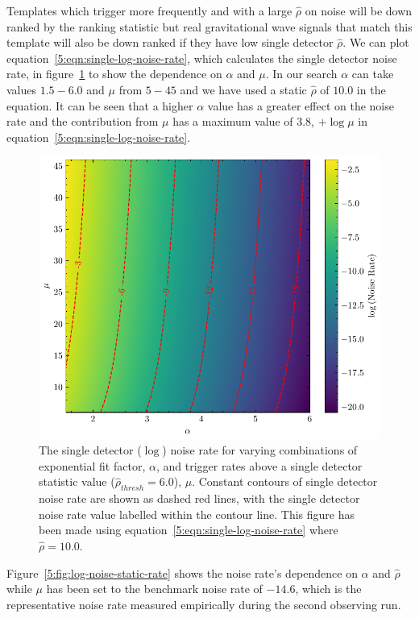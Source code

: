 Templates which trigger more frequently and with a large $\hat{\rho}$ on noise will be down ranked by the ranking statistic but real gravitational wave signals that match this template will also be down ranked if they have low single detector $\hat{\rho}$. We can plot equation~\ref{5:eqn:single-log-noise-rate}, which calculates the single detector noise rate, in figure~\ref{5:fig:log-noise-static-snr} to show the dependence on $\alpha$ and $\mu$. In our search $\alpha$ can take values $1.5 - 6.0$ and $\mu$ from $5 - 45$ and we have used a static $\hat{\rho}$ of $10.0$ in the equation. It can be seen that a higher $\alpha$ value has a greater effect on the noise rate and the contribution from $\mu$ has a maximum value of $3.8$, $ + \log\mu$ in equation~\ref{5:eqn:single-log-noise-rate}.
%
\begin{figure}
    \centering
    \includegraphics[width=1\textwidth]{images/5_pycbclive/high-noise-rate/lognoise_alpha_rate.pdf}
    \caption{The single detector ($\log$) noise rate for varying combinations of exponential fit factor, $\alpha$, and trigger rates above a single detector statistic value ($\hat{\rho}_{thresh} = 6.0$), $\mu$. Constant contours of single detector noise rate are shown as dashed red lines, with the single detector noise rate value labelled within the contour line. This figure has been made using equation~\ref{5:eqn:single-log-noise-rate} where $\hat{\rho} = 10.0$.}
    \label{5:fig:log-noise-static-snr}
\end{figure}
%
Figure~\ref{5:fig:log-noise-static-rate} shows the noise rate's dependence on $\alpha$ and $\hat{\rho}$ while $\mu$ has been set to the benchmark noise rate of $-14.6$, which is the representative noise rate measured empirically during the second observing run. 

